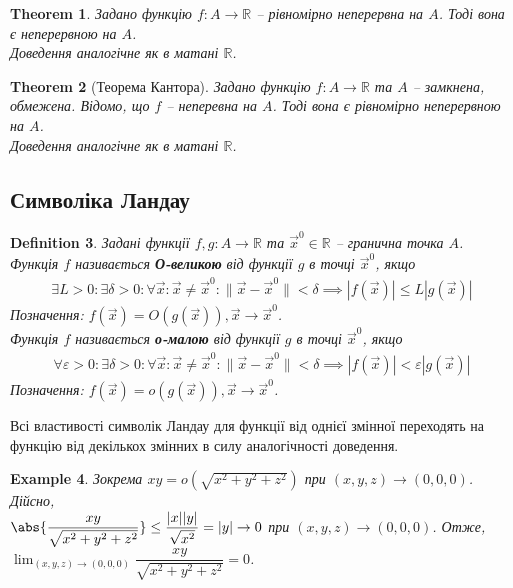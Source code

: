 \documentclass[a4paper, 10pt]{article}
\theoremstyle{theoremdd}
\newtheorem{theorem}{Theorem}[subsection]
\theoremstyle{theoremdd}
\theoremstyle{theoremdd}
\newtheorem{definition}[theorem]{Definition}
\theoremstyle{theoremdd}
\theoremstyle{theoremdd}
\newtheorem{example}[theorem]{Example}
\theoremstyle{theoremdd}
\theoremstyle{theoremdd}
\theoremstyle{theoremdd}
\theoremstyle{theoremdd}
\newcommand\Norm[1]{\|#1\|}
\begin{document}
\begin{theorem}
Задано функцію $f \colon A \to \mathbb{R}$ -- рівномірно неперервна на $A$. Тоді вона є неперервною на $A$.\\
\textit{Доведення аналогічне як в матані $\mathbb{R}$.}
\end{theorem}

\begin{theorem}[Теорема Кантора]
Задано функцію $f \colon A \to \mathbb{R}$ та $A$ -- замкнена, обмежена. Відомо, що $f$ -- неперевна на $A$. Тоді вона є рівномірно неперервною на $A$.\\
\textit{Доведення аналогічне як в матані $\mathbb{R}$.}
\end{theorem}

\subsection{Символіка Ландау}
\begin{definition}
Задані функції $f,g \colon A \to \mathbb{R}$ та $\vec{x}^0 \in \mathbb{R}$ -- гранична точка $A$.\\
Функція $f$ називається \textbf{О-великою} від функції $g$ в точці $\vec{x}^0$, якщо
\begin{align*}
\exists L>0: \exists \delta > 0: \forall \vec{x}: \vec{x} \neq \vec{x}^0: \Norm{\vec{x} - \vec{x}^0} < \delta \implies |f(\vec{x})| \leq L |g(\vec{x})|
\end{align*}
Позначення: $f(\vec{x}) = O(g(\vec{x})), \vec{x} \to \vec{x}^0$.\\
Функція $f$ називається \textbf{о-малою} від функції $g$ в точці $\vec{x}^0$, якщо
\begin{align*}
\forall \varepsilon>0: \exists \delta > 0: \forall \vec{x}: \vec{x} \neq \vec{x}^0: \Norm{\vec{x} - \vec{x}^0} < \delta \implies |f(\vec{x})| < \varepsilon |g(\vec{x})|
\end{align*}
Позначення: $f(\vec{x}) = o(g(\vec{x})), \vec{x} \to \vec{x}^0$.
\end{definition}

Всі властивості символік Ландау для функції від однієї змінної переходять на функцію від декількох змінних в силу аналогічності доведення.

\begin{example}
Зокрема $xy = o( \sqrt{x^2+y^2+z^2})$ при $(x,y,z) \to (0,0,0)$. Дійсно,\\
$\abs{\dfrac{xy}{\sqrt{x^2+y^2+z^2}}} \leq \dfrac{|x| |y|}{\sqrt{x^2}} = |y| \to 0$ при $(x,y,z) \to (0,0,0)$. Отже,
$\displaystyle\lim_{(x,y,z) \to (0,0,0)} \dfrac{xy}{\sqrt{x^2+y^2+z^2}} = 0$.
\end{example}
\end{document}
